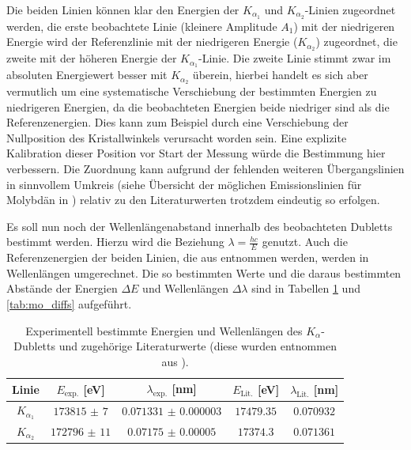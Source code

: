
Die beiden Linien können klar den Energien der $K_{\alpha_1}$ und $K_{\alpha_2}$-Linien zugeordnet werden, die erste beobachtete Linie (kleinere Amplitude $A_1$) mit der niedrigeren Energie wird der Referenzlinie mit der niedrigeren Energie ($K_{\alpha_2}$) zugeordnet, die zweite mit der höheren Energie der $K_{\alpha_1}$-Linie. Die zweite Linie stimmt zwar im absoluten Energiewert besser mit $K_{\alpha_2}$ überein, hierbei handelt es sich aber vermutlich um eine systematische Verschiebung der bestimmten Energien zu niedrigeren Energien, da die beobachteten Energien beide niedriger sind als die Referenzenergien. Dies kann zum Beispiel durch eine Verschiebung der Nullposition des Kristallwinkels verursacht worden sein. Eine explizite Kalibration dieser Position vor Start der Messung würde die Bestimmung hier verbessern. Die Zuordnung kann aufgrund der fehlenden weiteren Übergangslinien in sinnvollem Umkreis (siehe Übersicht der möglichen Emissionslinien für Molybdän in \cite{NISTxray}) relativ zu den Literaturwerten trotzdem eindeutig so erfolgen.

Es soll nun noch der Wellenlängenabstand innerhalb des beobachteten Dubletts bestimmt werden. Hierzu wird die Beziehung $\lambda=\frac{hc}{E}$ genutzt. Auch die Referenzenergien der beiden Linien, die aus \cite{xraydatabooklet} entnommen werden, werden in Wellenlängen umgerechnet. Die so bestimmten Werte und die daraus bestimmten Abstände der Energien $\Delta E$ und Wellenlängen $\Delta \lambda$ sind in Tabellen \ref{tab:mo_wavelengths} und \ref{tab:mo_diffs} aufgeführt.


\begin{table}[H]
	\centering
	\begin{tabular}{|c|c|c|c|c|} \hline
    Linie & $E_{\text{exp.}}$ [eV] & $\lambda_{\text{exp.}}$ [nm] & $E_{\text{Lit.}}$ [eV] & $\lambda_{\text{Lit.}}$ [nm]\\ \hline
    $K_{\alpha_1}$ & $\num{173815(7)}$ & $\num{0.071331(3)}$ & $\num{17479.35}$ & $\num{0.070932}$\\
    $K_{\alpha_2}$ & $\num{172796(11)}$ & $\num{0.07175(5)}$ & $\num{17374.3}$ & $\num{0.071361}$ \\
    \hline
	\end{tabular}
	\caption{Experimentell bestimmte Energien und Wellenlängen des $K_\alpha$-Dubletts und zugehörige Literaturwerte (diese wurden entnommen aus \cite{xraydatabooklet}).}
	\label{tab:mo_wavelengths}
\end{table}

